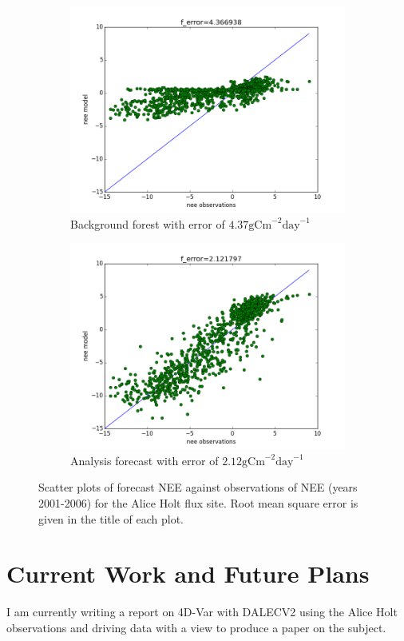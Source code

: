 \documentclass[11pt]{article}
\begin{document}
\begin{figure}[!h]
\centering
\begin{subfigure}{.5\textwidth}
  \centering
  \includegraphics[width=.7\linewidth]{scatterobsvsmodfb.png}
  \caption{Background forest with error of $4.37 \text{gCm}^{-2}\text{day}^{-1}$}
  \label{fig:sub1}
\end{subfigure}%
\begin{subfigure}{.5\textwidth}
  \centering
  \includegraphics[width=.7\linewidth]{scatterobsvsmodfa.png}
  \caption{Analysis forecast with error of $2.12 \text{gCm}^{-2}\text{day}^{-1}$}
  \label{fig:sub2}
\end{subfigure}
\caption{Scatter plots of forecast NEE against observations of NEE (years 2001-2006) for the Alice Holt flux site. Root mean square error is given in the title of each plot.}
\label{fig:neeobs}
\end{figure}

\section{Current Work and Future Plans}

I am currently writing a report on 4D-Var with DALECV2 using the Alice Holt observations and driving data with a view to produce a paper on the subject.
\end{document}

